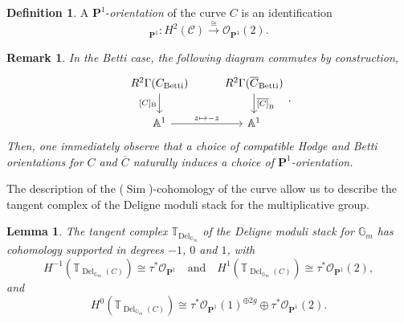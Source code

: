\documentclass[11pt, a4paper]{amsart}
\numberwithin{equation}{section}
\newtheorem{lemma}[theorem]{Lemma}
\newtheorem{remark}[theorem]{Remark}
\theoremstyle{definition}
\newtheorem{definition}[theorem]{Definition}
\theoremstyle{remark}
\DeclareMathOperator{\Deligne}{Del}
\DeclareMathOperator{\Betti}{Betti}
\DeclareMathOperator{\Sim}{Sim}
\DeclareMathOperator{\Del}{Del}
\newcommand{\Cc}{\mathcal{C}}
\newcommand{\Oo}{\mathcal{O}}
\newcommand{\B}{\mathrm{B}}
\renewcommand{\P}{\mathbf{P}}
\newcommand{\ol}[1]{\overline{#1}}
\renewcommand{\AA}{\mathbb{A}}
\newcommand{\GG}{\mathbb{G}}
\newcommand{\TT}{\mathbb{T}}
\renewcommand{\to}{\longrightarrow}
\begin{document}
\begin{definition}
    A $\P^1$-\textit{orientation} of the curve $C$ is an identification
    \begin{equation}
        [C]_{\P^1}: H^2(\Cc) \stackrel{\cong}{\to} \Oo_{\P^1}(2).
    \end{equation}
\end{definition}

\begin{remark}
In the Betti case, the following diagram commutes by construction, 
\[    
\begin{tikzcd}
	R^2\Gamma(C_{\Betti}) & R^2\Gamma(\ol{C}_{\Betti}) \\
	\AA^1 & \AA^1
	\arrow["{[C]_{\B}}"', from=1-1, to=2-1]
	\arrow["{\ol{[C]}_{\B}}", from=1-2, to=2-2]
	\arrow["{z \mapsto -z}", from=2-1, to=2-2]
\end{tikzcd}.
\]
Then, one immediately observe that a choice of compatible Hodge and Betti orientations for $C$ and $\ol{C}$ naturally induces a choice of $\P^1$-orientation.
\end{remark}


The description of the ($\Sim$)-cohomology of the curve allow us to describe the tangent complex of the Deligne moduli stack for the multiplicative group.

\begin{lemma} \label{lm description of T_Del}
The tangent complex $\TT_{\Del_{\GG_m}}$ of the Deligne moduli stack for $\GG_m$ has cohomology supported in degrees $-1$, $0$ and $1$, with
\begin{equation} \label{eq description of T_Del}
H^{-1}(\TT_{\Deligne_{\GG_m}(C)}) \cong \tau^*\Oo_{\P^1} \quad \text{and} \quad H^{1}(\TT_{\Deligne_{\GG_m}(C)}) \cong \tau^*\Oo_{\P^1}(2),
\end{equation}
and
\[
H^{0}(\TT_{\Deligne_{\GG_m}(C)}) \cong \tau^*\Oo_{\P^1}(1)^{\oplus 2g} \oplus \tau^*\Oo_{\P^1}(2).
\]
\end{lemma}
\end{document}
